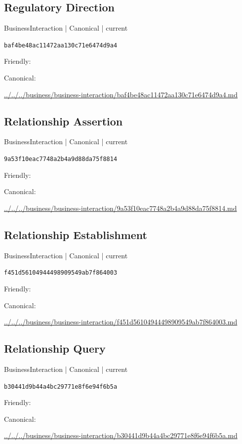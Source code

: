 \documentclass[10pt,a4paper]{article}
\begin{document}
\subsection*{Regulatory Direction}
{\small BusinessInteraction | Canonical | current}\par
\texttt{baf4be48ac11472aa130c71e6474d9a4}\par
Friendly: \par
Canonical: \par
{\footnotesize\url{../../../business/business-interaction/baf4be48ac11472aa130c71e6474d9a4.md}}\par
\subsection*{Relationship Assertion}
{\small BusinessInteraction | Canonical | current}\par
\texttt{9a53f10eac7748a2b4a9d88da75f8814}\par
Friendly: \par
Canonical: \par
{\footnotesize\url{../../../business/business-interaction/9a53f10eac7748a2b4a9d88da75f8814.md}}\par
\subsection*{Relationship Establishment}
{\small BusinessInteraction | Canonical | current}\par
\texttt{f451d56104944498909549ab7f864003}\par
Friendly: \par
Canonical: \par
{\footnotesize\url{../../../business/business-interaction/f451d56104944498909549ab7f864003.md}}\par
\subsection*{Relationship Query}
{\small BusinessInteraction | Canonical | current}\par
\texttt{b30441d9b44a4bc29771e8f6e94f6b5a}\par
Friendly: \par
Canonical: \par
{\footnotesize\url{../../../business/business-interaction/b30441d9b44a4bc29771e8f6e94f6b5a.md}}\par
\end{document}
